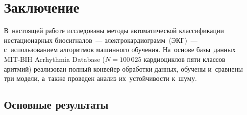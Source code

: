 \section{Заключение}
\label{sec:Chapter5}

В~настоящей работе исследованы методы автоматической классификации
нестационарных биосигналов~--- электрокардиограмм~(ЭКГ)~---
с~использованием алгоритмов машинного обучения.
На~основе базы~данных MIT-BIH Arrhythmia Database
($N = 100\,025$ кардиоциклов пяти классов аритмий)
реализован полный конвейер обработки данных, обучены и~сравнены
три модели, а~также проведен анализ их~устойчивости к~шуму.

\subsection*{Основные результаты}

